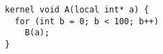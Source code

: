\newsavebox{\PoclUndefinedSymbols}
\begin{lrbox}{\PoclUndefinedSymbols}
  \begin{minipage}{\textwidth}
    \begin{verbatim}
kernel void A(local int* a) {
  for (int b = 0; b < 100; b++)
    B(a);
}
    \end{verbatim}
  \end{minipage}
\end{lrbox}
